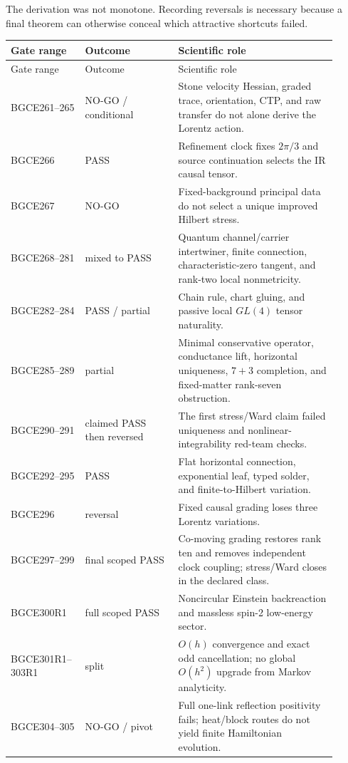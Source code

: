 \documentclass[11pt]{article}
\theoremstyle{definition}
\theoremstyle{remark}
\begin{document}
The derivation was not monotone. Recording reversals is necessary because a final theorem can otherwise conceal which attractive shortcuts failed.

\begin{longtable}{>{\raggedright\arraybackslash}p{0.18\linewidth} >{\raggedright\arraybackslash}p{0.27\linewidth} >{\raggedright\arraybackslash}p{0.46\linewidth}}
\toprule
Gate range & Outcome & Scientific role \\
\midrule
\endfirsthead
\toprule
Gate range & Outcome & Scientific role \\
\midrule
\endhead
BGCE261--265 & NO-GO / conditional & Stone velocity Hessian, graded trace, orientation, CTP, and raw transfer do not alone derive the Lorentz action. \\
BGCE266 & PASS & Refinement clock fixes $2\pi/3$ and source continuation selects the IR causal tensor. \\
BGCE267 & NO-GO & Fixed-background principal data do not select a unique improved Hilbert stress. \\
BGCE268--281 & mixed to PASS & Quantum channel/carrier intertwiner, finite connection, characteristic-zero tangent, and rank-two local nonmetricity. \\
BGCE282--284 & PASS / partial & Chain rule, chart gluing, and passive local $GL(4)$ tensor naturality. \\
BGCE285--289 & partial & Minimal conservative operator, conductance lift, horizontal uniqueness, $7+3$ completion, and fixed-matter rank-seven obstruction. \\
BGCE290--291 & claimed PASS then reversed & The first stress/Ward claim failed uniqueness and nonlinear-integrability red-team checks. \\
BGCE292--295 & PASS & Flat horizontal connection, exponential leaf, typed solder, and finite-to-Hilbert variation. \\
BGCE296 & reversal & Fixed causal grading loses three Lorentz variations. \\
BGCE297--299 & final scoped PASS & Co-moving grading restores rank ten and removes independent clock coupling; stress/Ward closes in the declared class. \\
BGCE300R1 & full scoped PASS & Noncircular Einstein backreaction and massless spin-2 low-energy sector. \\
BGCE301R1--303R1 & split & $O(h)$ convergence and exact odd cancellation; no global $O(h^2)$ upgrade from Markov analyticity. \\
BGCE304--305 & NO-GO / pivot & Full one-link reflection positivity fails; heat/block routes do not yield finite Hamiltonian evolution. \\

\end{longtable}
\end{document}
